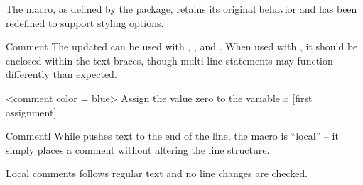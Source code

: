 \documentclass[a4paper, 11pt]{article}
\begin{document}
The  macro, as defined by the  package, retains its original behavior and has been redefined to support styling options.

\begin{Macrodef}{Comment}{}{}
    The updated  can be used with , , and . When used with , it should be enclosed within the text braces, though multi-line statements may function differently than expected.

    \MacroOptionsText
\end{Macrodef}

\begin{PDExample}
    \begin{minipage}{7.5cm}
        \begin{algorithmic}<comment color = blue>%
            \State Assign the value zero to the variable $x$
            [first assignment]%
        \end{algorithmic}
    \end{minipage}
\end{PDExample}

\begin{Macrodef}{Commentl}{}{}
    While  pushes text to the end of the line, the  macro is ``local'' -- it simply places a comment without altering the line structure.

    Local comments follows regular text and no line changes are checked.

    \MacroOptionsText
\end{Macrodef}

\begin{PDExample}
    \begin{algorithmic}
        \EndIf
    \end{algorithmic}
\end{PDExample}
\end{document}
